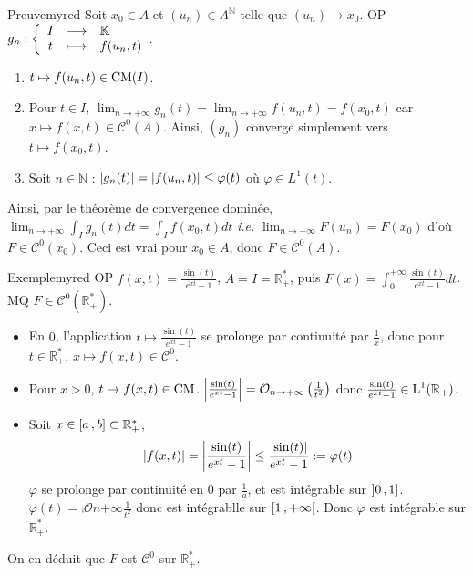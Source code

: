     \begin{demo}{Preuve}{myred}
        Soit $x_0 \in A$ et $(u_n) \in A^{\mathbb{N}}$ telle que $(u_n) \to x_0$. OP $\fonction{g_n}{I}{\mathbb{K}}{t}{f(u_n,t)}$.
        \begin{enumerate}
            \item $t \mapsto f(u_n,t) \in \operatorname{CM}(I)$.
            \item Pour $t \in I$, $\lim_{n \to +\infty} g_n(t) = \lim_{n \to +\infty} f(u_n,t) = f(x_0,t)$ car $x \mapsto f(x,t) \in \mathcal{C}^0(A)$. Ainsi, $(g_n)$ converge simplement vers $t \mapsto f(x_0,t)$.
            \item Soit $n \in \mathbb{N}$ : $\left\lvert g_n(t)\right\rvert = \left\lvert f(u_n,t)\right\rvert \leq \varphi(t)$ où $\varphi \in L^1(t)$. 
        \end{enumerate}
        Ainsi, par le théorème de convergence dominée, $\lim_{n \to +\infty} \int_{I} g_n(t) dt = \int_{I} f(x_0,t) dt$ \textit{i.e.} $\lim_{n \to + \infty} F(u_n) = F(x_0)$ d’où $F \in \mathcal{C}^0(x_0)$. Ceci est vrai pour $x_0 \in A$, donc $F \in \mathcal{C}^0(A)$.
    \end{demo} 

    \begin{omed}{Exemple}{myred}
        OP $f(x,t) = \frac{\sin(t)}{e^{xt} - 1}$, $A = I = \mathbb{R}_+^*$, puis $F(x) = \int_{0}^{+\infty} \frac{\sin(t)}{e^{xt} - 1} dt$. MQ $F \in \mathcal{C}^0(\mathbb{R}_+^*)$.
        \begin{itemize}
            \item En $0$, l’application $t \mapsto \frac{\sin(t)}{e^{xt} - 1}$ se prolonge par continuité par $\frac{1}{x}$, donc pour $t \in \mathbb{R}_+^*$, $x \mapsto f(x,t) \in \mathcal{C}^0$.
            \item Pour $x > 0$, $t \mapsto f(x,t) \in \operatorname{CM}$. $\left\lvert \frac{\sin(t)}{e^{xt} - 1}\right\rvert = \mathcal{O}_{n \rightarrow +\infty} \left(\frac{1}{t^2}\right)$ donc $\frac{\sin(t)}{e^{xt} - 1} \in \operatorname{L}^1(\mathbb{R}_+)$. 
            \item Soit $x \in \left[ a \, , b \right] \subset \mathbb{R}_+^*$,
            \[ \left\lvert f(x,t)\right\rvert = \left\lvert \frac{\sin(t)}{e^{xt} - 1}\right\rvert \leq \frac{\left\lvert \sin(t)\right\rvert}{e^{xt}- 1} := \varphi(t)  \]
            $\varphi$ se prolonge par continuité en $0$ par $\frac{1}{a}$, et est intégrable sur $\left] 0 \, , 1 \right]$. $\varphi(t) = \comp{\mathcal{O}}{n}{+\infty}{\frac{1}{t^2}}$ donc est intégrablle sur $\left[ 1 \, , +\infty \right[$. Donc $\varphi$ est intégrable sur $\mathbb{R}^*_+$.
        \end{itemize}
        On en déduit que $F$ est $\mathcal{C}^0$ sur $\mathbb{R}_+^*$.
    \end{omed}

